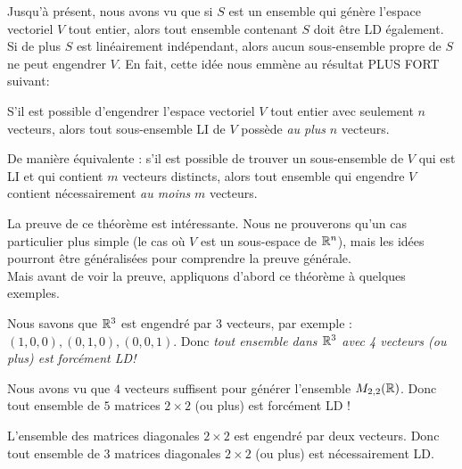 Jusqu'à présent, nous avons vu que si $S$ est un ensemble qui génère l'espace vectoriel $V$ tout entier, alors 
tout ensemble contenant $S$ doit être LD également.  Si de plus $S$ est linéairement indépendant, alors aucun sous-ensemble propre de $S$ ne peut
engendrer $V$.  En fait, cette idée nous emmène au résultat PLUS FORT suivant: 

\begin{theorem} \label{le GRAND theoreme}
S'il est possible d'engendrer l'espace vectoriel $V$ tout entier avec seulement $n$ vecteurs, alors
tout sous-ensemble LI de $V$ possède \emph{au plus} $n$ vecteurs.

De manière équivalente : s'il est possible de trouver un sous-ensemble de $V$ qui est LI et qui contient $m$ vecteurs distincts, alors tout ensemble qui engendre $V$ contient nécessairement \emph{au moins} $m$ vecteurs.
\end{theorem}



La preuve de ce théorème est intéressante. Nous ne prouverons qu'un cas particulier plus simple (le cas où $V$ est un sous-espace de $\mathbb{R}^n$), mais les idées pourront être généralisées pour comprendre la preuve générale. \\


Mais avant de voir la preuve, appliquons d'abord ce théorème à quelques exemples.

\begin{myexample} Nous savons que $\mathbb{R}^3$ est engendré par $3$ vecteurs, par exemple : $(1,0,0), (0,1,0), (0,0,1)$.  Donc \emph{tout ensemble
dans $\mathbb{R}^3$ avec 4 vecteurs (ou plus) est forcément LD!} \end{myexample}

\begin{myexample} Nous avons vu que $4$ vecteurs suffisent pour générer l'ensemble $M_{2,2}(\mathbb{R})$.
 Donc tout ensemble de $5$ matrices $2 \times 2$ (ou plus) est forcément LD !  \end{myexample}

\begin{myexample} L'ensemble des matrices diagonales $2\times 2$ est engendr\'e par deux vecteurs. Donc tout ensemble de $3$ matrices diagonales $2\times 2$ (ou plus) est nécessairement LD. \end{myexample}

